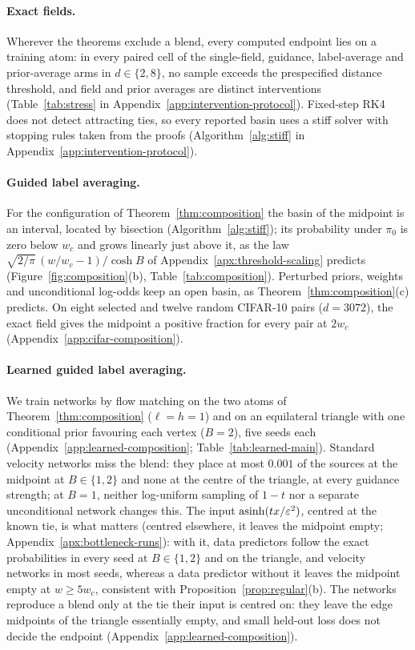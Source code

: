 \documentclass{article} %
\theoremstyle{plain}
\theoremstyle{definition}
\theoremstyle{remark}
\begin{document}
\paragraph{Exact fields.} Wherever the theorems exclude a blend, every computed endpoint lies on a
training atom: in every paired cell of the single-field, guidance, label-average and
prior-average arms in $d\in\{2,8\}$, no sample exceeds the prespecified distance threshold, and field and prior
averages are distinct interventions (Table~\ref{tab:stress} in
Appendix~\ref{app:intervention-protocol}). Fixed-step RK4 does not detect attracting ties, so
every reported basin uses a stiff solver with stopping rules taken from the proofs
(Algorithm~\ref{alg:stiff} in Appendix~\ref{app:intervention-protocol}).

\paragraph{Guided label averaging.} For the configuration of Theorem~\ref{thm:composition} the
basin of the midpoint is an interval, located by bisection (Algorithm~\ref{alg:stiff}); its probability under $\pi_0$ is zero
below $w_c$ and grows linearly just above it, as the law $\sqrt{2/\pi}\,(w/w_c-1)/\cosh B$ of
Appendix~\ref{apx:threshold-scaling} predicts (Figure~\ref{fig:composition}(b),
Table~\ref{tab:composition}). Perturbed priors, weights and unconditional log-odds keep an open
basin, as Theorem~\ref{thm:composition}(c) predicts. On eight selected and twelve random CIFAR-10
pairs ($d=3072$), the exact field gives the midpoint a positive fraction for every pair at
$2w_c$ (Appendix~\ref{app:cifar-composition}).

\paragraph{Learned guided label averaging.} We train networks by flow matching on the two atoms
of Theorem~\ref{thm:composition} ($\ell=h=1$) and on an equilateral triangle with one conditional
prior favouring each vertex ($B=2$), five seeds each (Appendix~\ref{app:learned-composition};
Table~\ref{tab:learned-main}). Standard velocity networks miss the blend: they place at most
$0.001$ of the sources at the midpoint at $B\in\{1,2\}$ and none at the centre of the triangle, at
every guidance strength; at $B=1$, neither log-uniform sampling of $1-t$ nor a separate
unconditional network changes this. The input $\operatorname{asinh}(tx/\varepsilon^2)$, centred at the
known tie, is what matters (centred elsewhere, it leaves the midpoint empty;
Appendix~\ref{apx:bottleneck-runs}): with it, data predictors follow the exact probabilities in
every seed at $B\in\{1,2\}$ and on the triangle, and velocity networks in most seeds, whereas a data predictor without it leaves the midpoint empty at
$w\ge5w_c$, consistent with Proposition~\ref{prop:regular}(b). The networks reproduce a blend only
at the tie their input is centred on: they leave the edge midpoints of the triangle essentially
empty, and small held-out loss does not decide the endpoint (Appendix~\ref{app:learned-composition}).
\end{document}
